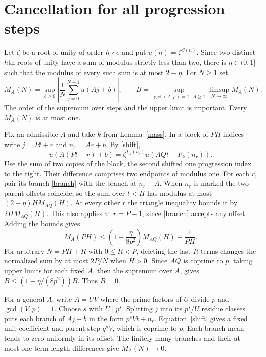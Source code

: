 \documentclass[11pt]{article}
\begin{document}
\section{Cancellation for all progression steps}
Let $\zeta$ be a root of unity of order $h\nmid e$ and put $u(n)=\zeta^{S(n)}$.
Since two distinct $h$th roots of unity have a sum of modulus strictly
less than two, there is $\eta\in(0,1]$ such that the modulus of every such
sum is at most $2-\eta$. For $N\ge1$ set
\[
 M_A(N)=\sup_{b\ge0}\left|\frac1N\sum_{j=0}^{N-1}u(Aj+b)\right|,\qquad
 B=\sup_{\gcd(A,p)=1,\ A\ge1}\limsup_{N\to\infty}M_A(N).
\]
The order of the supremum over steps and the upper limit is important.
Every $M_A(N)$ is at most one.

Fix an admissible $A$ and take $k$ from Lemma~\ref{mass}. In a block of
$PH$ indices write $j=Pt+r$ and $n_r=Ar+b$. By \eqref{shift},
\begin{equation}
 u(A(Pt+r)+b)=\zeta^{L_k(n_r)}u(AQt+F_k(n_r)).\label{branch}
\end{equation}
Use the sum of two copies of the block, the second shifted one progression
index to the right. Their difference comprises two endpoints of modulus one.
For each $r$, pair its branch \eqref{branch} with the branch at $n_r+A$.
When $n_r$ is marked the two parent offsets coincide, so the sum over $t<H$
has modulus at most $(2-\eta)H M_{AQ}(H)$. At every other $r$ the triangle
inequality bounds it by $2H M_{AQ}(H)$. This also applies at $r=P-1$,
since \eqref{branch} accepts any offset. Adding the bounds gives
\begin{equation}
 M_A(PH)\le \left(1-\frac{\eta}{8p^2}\right) M_{AQ}(H)+\frac1{PH}.
 \label{contraction}
\end{equation}
For arbitrary $N=PH+R$ with $0\le R<P$, deleting the last $R$ terms changes
the normalized sum by at most $2P/N$ when $H>0$. Since $AQ$ is coprime to
$p$, taking upper limits for each fixed $A$, then the supremum over $A$,
gives $B\le(1-\eta/(8p^2))B$. Thus $B=0$.

For a general $A$, write $A=UV$ where the prime factors of $U$ divide $p$
and $\gcd(V,p)=1$. Choose $s$ with $U\mid p^s$. Splitting $j$ into its
$p^s/U$ residue classes puts each branch of $Aj+b$ in the form
$p^s Vt+n_r$. Equation~\eqref{shift} gives a fixed unit coefficient
and parent step $q^s V$, which is coprime to $p$. Each branch mean tends
to zero uniformly in its offset. The finitely many branches and their
at most one-term length differences give $M_A(N)\to0$.
\end{document}
